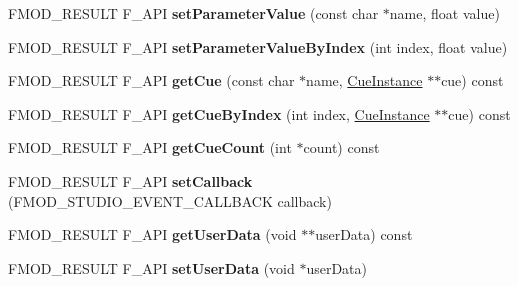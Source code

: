 \begin{DoxyCompactItemize}
\item 
\hypertarget{class_f_m_o_d_1_1_studio_1_1_event_instance_aca52eec7f7b53cf4ebfcc4241e85960b}{F\+M\+O\+D\+\_\+\+R\+E\+S\+U\+L\+T F\+\_\+\+A\+P\+I {\bfseries set\+Parameter\+Value} (const char $\ast$name, float value)}\label{class_f_m_o_d_1_1_studio_1_1_event_instance_aca52eec7f7b53cf4ebfcc4241e85960b}

\item 
\hypertarget{class_f_m_o_d_1_1_studio_1_1_event_instance_a3e977541a058767096e229782d5f1175}{F\+M\+O\+D\+\_\+\+R\+E\+S\+U\+L\+T F\+\_\+\+A\+P\+I {\bfseries set\+Parameter\+Value\+By\+Index} (int index, float value)}\label{class_f_m_o_d_1_1_studio_1_1_event_instance_a3e977541a058767096e229782d5f1175}

\item 
\hypertarget{class_f_m_o_d_1_1_studio_1_1_event_instance_a037542d9499bc4b44fe614ab61032490}{F\+M\+O\+D\+\_\+\+R\+E\+S\+U\+L\+T F\+\_\+\+A\+P\+I {\bfseries get\+Cue} (const char $\ast$name, \hyperlink{class_f_m_o_d_1_1_studio_1_1_cue_instance}{Cue\+Instance} $\ast$$\ast$cue) const }\label{class_f_m_o_d_1_1_studio_1_1_event_instance_a037542d9499bc4b44fe614ab61032490}

\item 
\hypertarget{class_f_m_o_d_1_1_studio_1_1_event_instance_abe8483f5ae0d155f7eb0039afea0ba03}{F\+M\+O\+D\+\_\+\+R\+E\+S\+U\+L\+T F\+\_\+\+A\+P\+I {\bfseries get\+Cue\+By\+Index} (int index, \hyperlink{class_f_m_o_d_1_1_studio_1_1_cue_instance}{Cue\+Instance} $\ast$$\ast$cue) const }\label{class_f_m_o_d_1_1_studio_1_1_event_instance_abe8483f5ae0d155f7eb0039afea0ba03}

\item 
\hypertarget{class_f_m_o_d_1_1_studio_1_1_event_instance_a86d15552cb0a51bf7cbcf81b6f65d6d3}{F\+M\+O\+D\+\_\+\+R\+E\+S\+U\+L\+T F\+\_\+\+A\+P\+I {\bfseries get\+Cue\+Count} (int $\ast$count) const }\label{class_f_m_o_d_1_1_studio_1_1_event_instance_a86d15552cb0a51bf7cbcf81b6f65d6d3}

\item 
\hypertarget{class_f_m_o_d_1_1_studio_1_1_event_instance_a3b668a1fd82263dd0676a99f5f40ab1f}{F\+M\+O\+D\+\_\+\+R\+E\+S\+U\+L\+T F\+\_\+\+A\+P\+I {\bfseries set\+Callback} (F\+M\+O\+D\+\_\+\+S\+T\+U\+D\+I\+O\+\_\+\+E\+V\+E\+N\+T\+\_\+\+C\+A\+L\+L\+B\+A\+C\+K callback)}\label{class_f_m_o_d_1_1_studio_1_1_event_instance_a3b668a1fd82263dd0676a99f5f40ab1f}

\item 
\hypertarget{class_f_m_o_d_1_1_studio_1_1_event_instance_a6888e3fc82e2f760eadda1932f734361}{F\+M\+O\+D\+\_\+\+R\+E\+S\+U\+L\+T F\+\_\+\+A\+P\+I {\bfseries get\+User\+Data} (void $\ast$$\ast$user\+Data) const }\label{class_f_m_o_d_1_1_studio_1_1_event_instance_a6888e3fc82e2f760eadda1932f734361}

\item 
\hypertarget{class_f_m_o_d_1_1_studio_1_1_event_instance_a424d43aa6ff7772a041825fe1a54cd56}{F\+M\+O\+D\+\_\+\+R\+E\+S\+U\+L\+T F\+\_\+\+A\+P\+I {\bfseries set\+User\+Data} (void $\ast$user\+Data)}\label{class_f_m_o_d_1_1_studio_1_1_event_instance_a424d43aa6ff7772a041825fe1a54cd56}

\end{DoxyCompactItemize}


